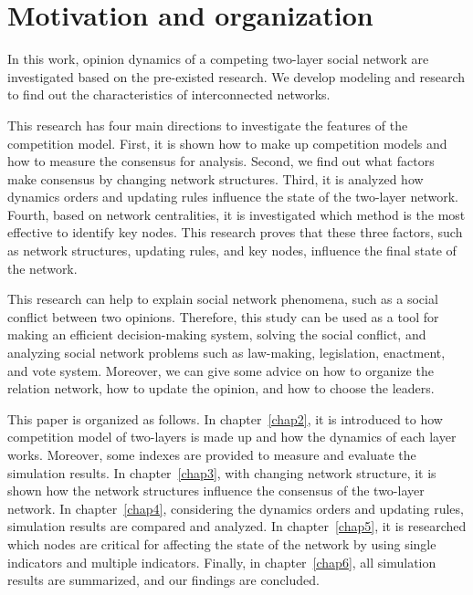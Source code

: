 \section{Motivation and organization}

In this work, opinion dynamics of a competing two-layer social network are investigated based on the pre-existed research\parencite{alvarez2016, gomez2015, diep2017, rocca2014}. We develop modeling and research to find out the characteristics of interconnected networks. 

This research has four main directions to investigate the features of the competition model. First, it is shown how to make up competition models and how to measure the consensus for analysis. Second, we find out what factors make consensus by changing network structures. Third, it is analyzed how dynamics orders and updating rules influence the state of the two-layer network. Fourth, based on network centralities, it is investigated which method is the most effective to identify key nodes. This research proves that these three factors, such as network structures, updating rules, and key nodes, influence the final state of the network.

This research can help to explain social network phenomena, such as a social conflict between two opinions. Therefore, this study can be used as a tool for making an efficient decision-making system, solving the social conflict, and analyzing social network problems such as law-making, legislation, enactment, and vote system. Moreover, we can give some advice on how to organize the relation network, how to update the opinion, and how to choose the leaders.

This paper is organized as follows. In chapter~\ref{chap2}, it is introduced to how competition model of two-layers is made up and how the dynamics of each layer works. Moreover, some indexes are provided to measure and evaluate the simulation results. In chapter~\ref{chap3}, with changing network structure, it is shown how the network structures influence the consensus of the two-layer network. In chapter~\ref{chap4}, considering the dynamics orders and updating rules, simulation results are compared and analyzed. In chapter~\ref{chap5}, it is researched which nodes are critical for affecting the state of the network by using single indicators and multiple indicators. Finally, in chapter~\ref{chap6}, all simulation results are summarized, and our findings are concluded. \\


